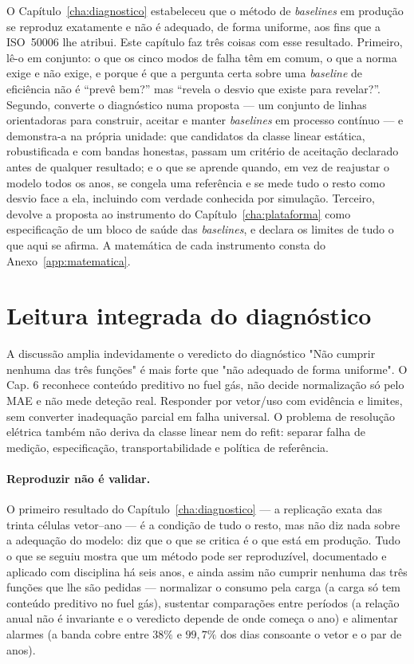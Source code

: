 O Capítulo~\ref{cha:diagnostico} estabeleceu que o método de \emph{baselines}
em produção se reproduz exatamente e não é adequado, de forma uniforme, aos
fins que a ISO~50006 lhe atribui. Este capítulo faz três coisas com esse
resultado. Primeiro, lê-o em conjunto: o que os cinco modos de falha têm em
comum, o que a norma exige e não exige, e porque é que a pergunta certa
sobre uma \emph{baseline} de eficiência não é ``prevê bem?'' mas ``revela o
desvio que existe para revelar?''. Segundo, converte o diagnóstico numa
proposta --- um conjunto de linhas orientadoras para construir, aceitar e
manter \emph{baselines} em processo contínuo --- e demonstra-a na própria
unidade: que candidatos da classe linear estática, robustificada e com
bandas honestas, passam um critério de aceitação declarado antes de
qualquer resultado; e o que se aprende quando, em vez de reajustar o modelo
todos os anos, se congela uma referência e se mede tudo o resto como desvio
face a ela, incluindo com verdade conhecida por simulação. Terceiro,
devolve a proposta ao instrumento do Capítulo~\ref{cha:plataforma} como
especificação de um bloco de saúde das \emph{baselines}, e declara os
limites de tudo o que aqui se afirma. A matemática de cada instrumento
consta do Anexo~\ref{app:matematica}.

\section{Leitura integrada do diagnóstico}
\label{sec:leitura-integrada}

{A discussão amplia indevidamente o veredicto do diagnóstico}
{"Não cumprir nenhuma das três funções" é mais forte que "não adequado
de forma uniforme". O Cap. 6 reconhece conteúdo preditivo no fuel gás,
não decide normalização só pelo MAE e não mede deteção real. Responder
por vetor/uso com evidência e limites, sem converter inadequação parcial
em falha universal. O problema de resolução elétrica também não deriva
da classe linear nem do refit: separar falha de medição, especificação,
transportabilidade e política de referência.}%
\paragraph{Reproduzir não é validar.} O primeiro resultado do
Capítulo~\ref{cha:diagnostico} --- a replicação exata das trinta células
vetor--ano --- é a condição de tudo o resto, mas não diz nada sobre a
adequação do modelo: diz que o que se critica é o que está em produção.
Tudo o que se seguiu mostra que um método pode ser reproduzível, documentado
e aplicado com disciplina há seis anos, e ainda assim não cumprir nenhuma
das três funções que lhe são pedidas --- normalizar o consumo pela carga
(a carga só tem conteúdo preditivo no fuel gás), sustentar comparações entre
períodos (a relação anual não é invariante e o veredicto depende de onde
começa o ano) e alimentar alarmes (a banda cobre entre $38\%$ e $99{,}7\%$
dos dias consoante o vetor e o par de anos).

